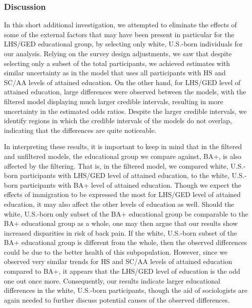 \FloatBarrier
\subsubsection{Discussion}
\label{section:application2:extension:discussion}
In this short additional investigation, we attempted to eliminate the effects of some of the external factors that may have been present in particular for the LHS/GED educational group, by selecting only white, U.S.-born individuals for our analysis. Relying on the survey design adjustments, we saw that despite selecting only a subset of the total participants, we achieved estimates with similar uncertainty as in the model that uses all participants with HS and SC/AA levels of attained education. On the other hand, for LHS/GED level of attained education, large differences were observed between the models, with the filtered model displaying much larger credible intervals, resulting in more uncertainty in the estimated odds ratios. Despite the larger credible intervals, we identify regions in which the credible intervals of the models do not overlap, indicating that the differences are quite noticeable. 

In interpreting these results, it is important to keep in mind that in the filtered and unfiltered models, the educational group we compare against, BA+, is also affected by the filtering. That is, in the filtered model, we compared white, U.S.-born participants with LHS/GED level of attained education, to the white, U.S.-born participants with BA+ level of attained education. Though we expect the effects of immigration to be expressed the most for LHS/GED level of attained education, it may also affect the other levels of education as well. Should the white, U.S.-born only subset of the BA+ educational group be comparable to the BA+ educational group as a whole, one may then argue that our results show increased disparities in risk of back pain. If the white, U.S.-born subset of the BA+ educational group is different from the whole, then the observed differences could be due to the better health of this subpopulation. However, since we observed very similar trends for HS and SC/AA levels of attained education compared to BA+, it appears that the LHS/GED level of education is the odd one out once more. Consequently, our results indicate larger educational differences in the white, U.S.-born participants, though the aid of sociologists are again needed to further discuss potential causes of the observed differences. 














